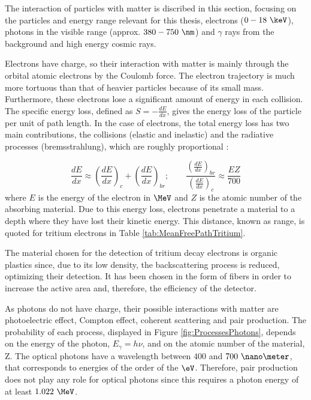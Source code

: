 The interaction of particles with matter is discribed in this section, focusing on the particles and energy range relevant for this thesis, electrons ($0-18~\keV$), photons in the visible range (approx. $380-750~\nm$) and $\gamma$ rays from the background and high energy cosmic rays.

Electrons have charge, so their interaction with matter is mainly through the orbital atomic  electrons by the Coulomb force. The electron trajectory is much more tortuous than that of heavier particles because of its small mass. Furthermore, these electrons lose a significant amount of energy in each collision. The specific energy loss, defined as $S=-\displaystyle{\frac{dE}{dx}}$, gives the energy loss of the particle per unit of path length. In the case of electrons, the total energy loss has two main contributions, the collisions (elastic and inelastic) and the radiative processes (bremsstrahlung), which are roughly proportional \cite{Knoll, Leo}:

\begin{equation}
\frac{dE}{dx} \approx \left(\frac{dE}{dx}\right)_{c} + \left(\frac{dE}{dx}\right)_{br} ; \qquad \frac{\displaystyle{\left(\frac{dE}{dx}\right)_{br}}}{\displaystyle{\left(\frac{dE}{dx}\right)_{c}}} \approx \frac{EZ}{700}
\label{eq:ElectronInteraction}
\end{equation}
where $E$ is the energy of the electron in $\MeV$ and $Z$ is the atomic number of the absorbing material. Due to this energy loss, electrons penetrate a material to a depth where they have lost their kinetic energy. This distance, known as range, is quoted for tritium electrons in Table \ref{tab:MeanFreePathTritium}. 

The material chosen for the detection of tritium decay electrons is organic plastics since, due to its low density, the backscattering process is reduced, optimizing their detection. It has been chosen in the form of fibers in order to increase the active area and, therefore, the efficiency of the detector.

As photons do not have charge, their possible interactions with matter are photoelectric effect, Compton effect, coherent scattering and pair production. The probability of each process, displayed in Figure \ref{fig:ProcessesPhotons}, depends on the energy of the photon, $E_\gamma = h\nu$, and on the atomic number of the material, Z. The optical photons have a wavelength between $400$ and $700~\nano\meter$, that corresponds to energies of the order of the $\eV$. Therefore, pair production does not play any role for optical photons since this requires a photon energy of at least $1.022~\MeV$.

